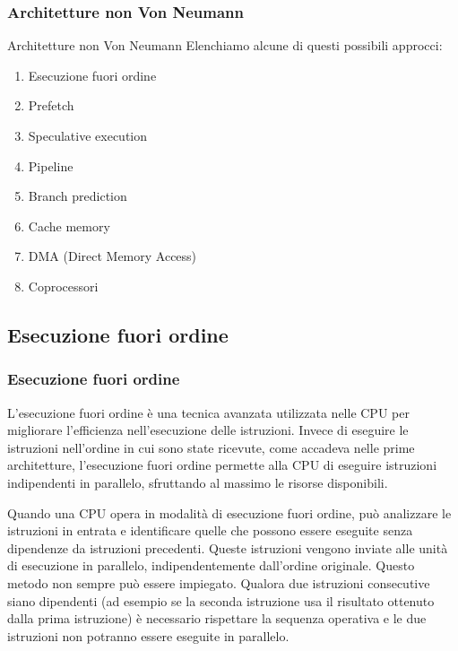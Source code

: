 \begin{frame}
	\frametitle{Architetture non Von Neumann}

	\begin{block}{Architetture non Von Neumann}
		Elenchiamo alcune di questi possibili approcci:
		\begin{enumerate}
			\item Esecuzione fuori ordine
			\item Prefetch
			\item Speculative execution
			\item Pipeline
			\item Branch prediction
			\item Cache memory
			\item DMA (Direct Memory Access)
			\item Coprocessori
		\end{enumerate}
	\end{block}

\end{frame}


\subsection[Esecuzione fuori ordine]{Esecuzione fuori ordine}
\begin{frame}
	\frametitle{ Esecuzione fuori ordine}

		L'esecuzione fuori ordine è una tecnica avanzata utilizzata nelle CPU per migliorare l'efficienza nell'esecuzione delle istruzioni. Invece di eseguire le istruzioni nell'ordine in cui sono state ricevute, come accadeva nelle prime architetture, l'esecuzione fuori ordine permette alla CPU di eseguire istruzioni indipendenti in parallelo, sfruttando al massimo le risorse disponibili.\vspace{0.5em}
		
		Quando una CPU opera in modalità di esecuzione fuori ordine, può analizzare le istruzioni in entrata e identificare quelle che possono essere eseguite senza dipendenze da istruzioni precedenti. Queste istruzioni vengono inviate alle unità di esecuzione in parallelo, indipendentemente dall'ordine originale. Questo metodo non sempre può essere impiegato. Qualora due istruzioni consecutive siano dipendenti (ad esempio se la seconda istruzione usa il risultato ottenuto dalla prima istruzione) è necessario rispettare la sequenza operativa e le due istruzioni non potranno essere eseguite in parallelo.

\end{frame}



